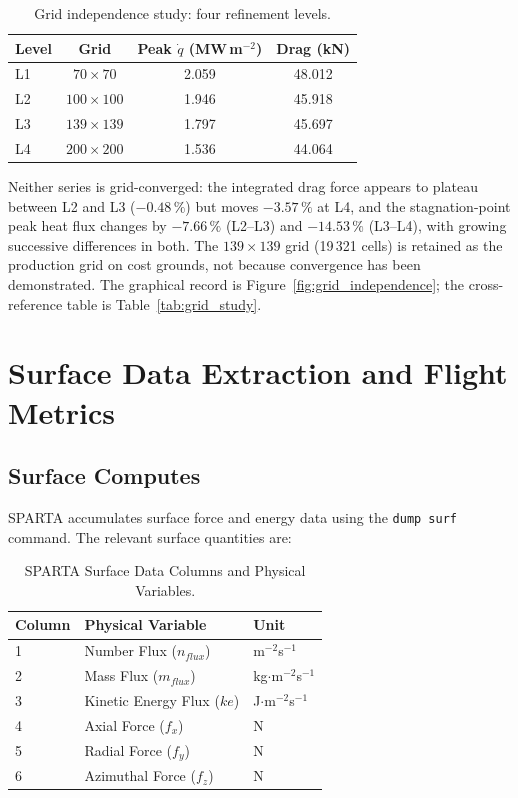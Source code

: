 \begin{table}[H]
    \centering
    \caption{Grid independence study: four refinement levels.}
    \label{tab:mesh_independence}
    \begin{tabular}{|l|c|c|c|}
        \hline
        \textbf{Level} & \textbf{Grid} & \textbf{Peak $\dot q$ (MW\,m$^{-2}$)} & \textbf{Drag (kN)} \\ \hline
        L1 & $70\times70$ & 2.059 & 48.012 \\ \hline
        L2 & $100\times100$ & 1.946 & 45.918 \\ \hline
        L3 & $139\times139$ & 1.797 & 45.697 \\ \hline
        L4 & $200\times200$ & 1.536 & 44.064 \\ \hline
    \end{tabular}
\end{table}

Neither series is grid-converged: the integrated drag force appears to plateau between L2 and L3 ($-0.48\,\%$) but moves $-3.57\,\%$ at L4, and the stagnation-point peak heat flux changes by $-7.66\,\%$ (L2--L3) and $-14.53\,\%$ (L3--L4), with growing successive differences in both. The $139\times139$ grid (19\,321 cells) is retained as the production grid on cost grounds, not because convergence has been demonstrated. The graphical record is Figure~\ref{fig:grid_independence}; the cross-reference table is Table~\ref{tab:grid_study}.

\section{Surface Data Extraction and Flight Metrics}

\subsection{Surface Computes}
SPARTA accumulates surface force and energy data using the \texttt{dump surf} command. The relevant surface quantities are:

\begin{table}[H]
    \centering
    \caption{SPARTA Surface Data Columns and Physical Variables.}
    \label{tab:surface_data}
    \begin{tabular}{|l|l|l|}
        \hline
        \textbf{Column} & \textbf{Physical Variable} & \textbf{Unit} \\ \hline
        1 & Number Flux ($n_{flux}$) & m$^{-2}$s$^{-1}$ \\ \hline
        2 & Mass Flux ($m_{flux}$) & kg$\cdot$m$^{-2}$s$^{-1}$ \\ \hline
        3 & Kinetic Energy Flux ($ke$) & J$\cdot$m$^{-2}$s$^{-1}$ \\ \hline
        4 & Axial Force ($f_x$) & N \\ \hline
        5 & Radial Force ($f_y$) & N \\ \hline
        6 & Azimuthal Force ($f_z$) & N \\ \hline
    \end{tabular}
\end{table}

